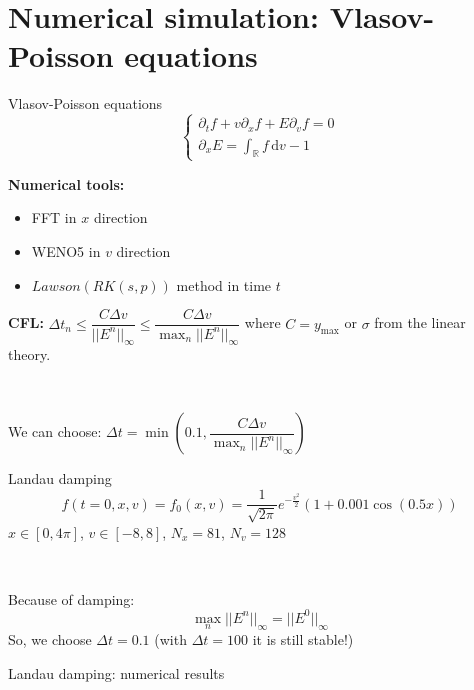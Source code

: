\documentclass{beamer}
\newcommand{\mbold}[1]{{\textbf{\color{PLB}#1}}}
\begin{document}
\section{Numerical simulation: Vlasov-Poisson equations}

\begin{frame}{Vlasov-Poisson equations}
  $$
    \begin{cases}
      \partial_tf + v\partial_xf + E\partial_vf = 0 \\
      \partial_xE = \int_{\mathbb{R}} f\,\mathrm{d}v - 1
    \end{cases}
  $$

  \mbold{Numerical tools:}
  \begin{itemize}
    \item FFT in $x$ direction
    \item WENO5 in $v$ direction
    \item $Lawson(RK(s,p))$ method in time $t$
  \end{itemize}

  \mbold{CFL:} $\Delta t_n \leq \dfrac{C\Delta v}{||E^n||_{\infty}} \leq \dfrac{C\Delta v}{\max_n||E^n||_{\infty}}$ where $C = y_\text{max}$ or $\sigma$ from the linear theory.

  \ 

  We can choose: $\Delta t = \min\left( 0.1 , \dfrac{C\Delta v}{\max_n||E^n||_{\infty}} \right)$
\end{frame}
\begin{frame}{Landau damping}
  $$
    f(t=0,x,v) = f_0(x,v) = \frac{1}{\sqrt{2\pi}}e^{-\frac{v^2}{2}}(1+0.001\cos(0.5x))
  $$
  $x\in[0,4\pi]$, $v\in[-8,8]$, $N_x = 81$, $N_v=128$

  \ 

  Because of damping:
  $$
    \max_n||E^n||_{\infty} = ||E^0||_\infty
  $$
  So, we choose $\Delta t = 0.1$ (with $\Delta t = 100$ it is still stable!)
\end{frame}
\begin{frame}{Landau damping: numerical results}
\end{frame}
\end{document}
